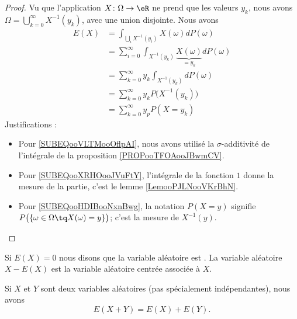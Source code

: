 \begin{proof}
	Vu que l'application \( X\colon \Omega\to \eR\) ne prend que les valeurs \( y_k\), nous avons \( \Omega=\bigcup_{k=0}^{\infty}X^{-1}(y_k)\), avec une union disjointe. Nous avons
	\begin{subequations}
		\begin{align}
			E(X) & =\int_{\bigcup_iX^{-1}(y_i)}X(\omega)dP(\omega)                                                                \\
			     & =\sum_{i=0}^{\infty}\int_{X^{-1}(y_k)}\underbrace{X(\omega)}_{=y_k}dP(\omega)      \label{SUBEQooVLTMooOflpAI} \\
			     & =\sum_{k=0}^{\infty}y_k\int_{X^{-1}(y_k)}dP(\omega)                                                            \\
			     & =\sum_{k=0}^{\infty}y_kP\big( X^{-1}(y_k) \big)        \label{SUBEQooXRHOooJVuFtY}                             \\
			     & =\sum_{k=0}^{\infty}y_pP(X=y_k)        \label{SUBEQooHDIBooNxnBwg}
		\end{align}
	\end{subequations}
	Justifications :
	\begin{itemize}
		\item
		      Pour \eqref{SUBEQooVLTMooOflpAI}, nous avons utilisé la \( \sigma\)-additivité de l'intégrale de la proposition \ref{PROPooTFOAooJBwmCV}.
		\item
		      Pour \eqref{SUBEQooXRHOooJVuFtY}, l'intégrale de la fonction \( 1\) donne la mesure de la partie, c'est le lemme \ref{LemooPJLNooVKrBhN}.
		\item
		      Pour \eqref{SUBEQooHDIBooNxnBwg}, la notation \( P(X=y)\) signifie \( P\big( \{ \omega\in \Omega \tq X(\omega)=y\}\big)\); c'est la mesure de \( X^{-1}(y)\).
	\end{itemize}
\end{proof}

\begin{definition}
	Si \( E(X)=0\) nous disons que la variable aléatoire est . La variable aléatoire \( X-E(X)\) est la variable aléatoire centrée associée à \( X\).
\end{definition}

\begin{proposition} \label{PropZBnsCgh}
	Si \( X\) et \( Y\) sont deux variables aléatoires (pas spécialement indépendantes), nous avons
	\begin{equation}
		E(X+Y)=E(X)+E(Y).
	\end{equation}
\end{proposition}

